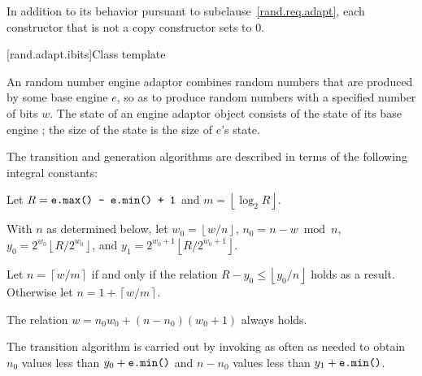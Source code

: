 \pnum
In addition to its behavior
pursuant to subclause~\ref{rand.req.adapt},
each constructor%
that is not a copy constructor
sets  to $0$.


[rand.adapt.ibits]{Class template }%
%

\pnum
An 
random number engine adaptor
combines random numbers
that are produced by some base engine $e$,
so as to produce random numbers
with a specified number of bits $w$.
The state%
%
of an 
engine adaptor object 
consists of
 the state  of its base engine ;
the size of the state is
 the size of $e$'s state.

\pnum
The transition and generation algorithms
are described in terms
of the following integral constants:%
\begin{enumeratea}
 \item
   Let
     $R = \texttt{e.max() - e.min() + 1}$
   and
     $m = \left\lfloor \log_2 R \right\rfloor$.
 \item
   With $n$ as determined below,
   let
     $w_0 = \left\lfloor w / n \right\rfloor$,
     $n_0 = n - w \bmod n$,
     $y_0 = 2^{w_0} \left\lfloor R / 2^{w_0} \right\rfloor$,
   and
     $y_1 = 2^{w_0 + 1} \left\lfloor R / 2^{w_0 + 1} \right\rfloor$.
 \item
   Let
     $n = \left\lceil w / m \right\rceil$
   if and only if the relation
     $R - y_0 \leq \left\lfloor y_0 / n \right\rfloor$
   holds as a result.
   Otherwise let
     $n = 1 + \left\lceil w / m \right\rceil$.
\end{enumeratea}
\begin{note}
 The relation
 $w = n_0 w_0 + (n - n_0)(w_0 + 1)$
 always holds.
\end{note}

\pnum
The transition algorithm%
%
is carried out by invoking 
as often as needed to obtain $n_0$
values less than $y_0 + \texttt{e.min()}$
and $n - n_0$ values less than $y_1 + \texttt{e.min()}$.

